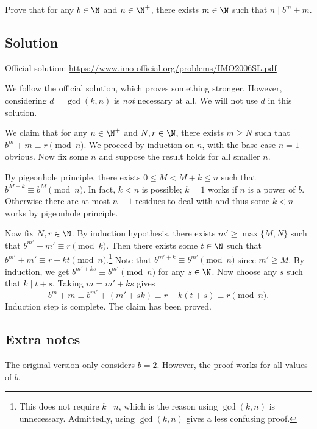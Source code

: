 Prove that for any $b \in \N$ and $n \in \N^+$, there exists $m \in \N$ such that $n \mid b^m + m$.



\subsection*{Solution}

Official solution: \url{https://www.imo-official.org/problems/IMO2006SL.pdf}

We follow the official solution, which proves something stronger.
However, considering $d = \gcd(k, n)$ is \emph{not} necessary at all.
We will not use $d$ in this solution.

We claim that for any $n \in \N^+$ and $N, r \in \N$, there exists $m \geq N$ such that $b^m + m \equiv r \pmod{n}$.
We proceed by induction on $n$, with the base case $n = 1$ obvious.
Now fix some $n$ and suppose the result holds for all smaller $n$.

By pigeonhole principle, there exists $0 \leq M < M + k \leq n$ such that $b^{M + k} \equiv b^M \pmod{n}$.
In fact, $k < n$ is possible; $k = 1$ works if $n$ is a power of $b$.
Otherwise there are at most $n - 1$ residues to deal with and thus some $k < n$ works by pigeonhole principle.

Now fix $N, r \in \N$.
By induction hypothesis, there exists $m' \geq \max\{M, N\}$ such that $b^{m'} + m' \equiv r \pmod{k}$.
Then there exists some $t \in \N$ such that $b^{m'} + m' \equiv r + kt \pmod{n}$.\footnote{
    This does not require $k \mid n$, which is the reason using $\gcd(k, n)$ is unnecessary.
    Admittedly, using $\gcd(k, n)$ gives a less confusing proof.}
Note that $b^{m' + k} \equiv b^{m'} \pmod{n}$ since $m' \geq M$.
By induction, we get $b^{m' + ks} \equiv b^{m'} \pmod{n}$ for any $s \in \N$.
Now choose any $s$ such that $k \mid t + s$.
Taking $m = m' + ks$ gives 
\[ b^m + m \equiv b^{m'} + (m' + sk) \equiv r + k(t + s) \equiv r \pmod{n}. \]
Induction step is complete.
The claim has been proved.



\subsection*{Extra notes}

The original version only considers $b = 2$.
However, the proof works for all values of $b$.

